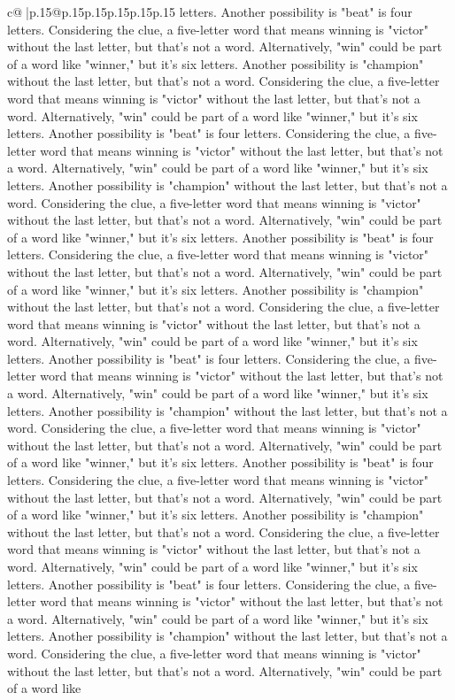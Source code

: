 \documentclass{article}
\begin{document}
{\begin{supertabular}{c@{$\;$}|p{.15\linewidth}@{}p{.15\linewidth}p{.15\linewidth}p{.15\linewidth}p{.15\linewidth}p{.15\linewidth}}
{{{letters. Another possibility is "beat" is four letters. Considering the clue, a five{-}letter word that means winning is "victor" without the last letter, but that's not a word. Alternatively, "win" could be part of a word like "winner," but it's six letters. Another possibility is "champion" without the last letter, but that's not a word. Considering the clue, a five{-}letter word that means winning is "victor" without the last letter, but that's not a word. Alternatively, "win" could be part of a word like "winner," but it's six letters. Another possibility is "beat" is four letters. Considering the clue, a five{-}letter word that means winning is "victor" without the last letter, but that's not a word. Alternatively, "win" could be part of a word like "winner," but it's six letters. Another possibility is "champion" without the last letter, but that's not a word. Considering the clue, a five{-}letter word that means winning is "victor" without the last letter, but that's not a word. Alternatively, "win" could be part of a word like "winner," but it's six letters. Another possibility is "beat" is four letters. Considering the clue, a five{-}letter word that means winning is "victor" without the last letter, but that's not a word. Alternatively, "win" could be part of a word like "winner," but it's six letters. Another possibility is "champion" without the last letter, but that's not a word. Considering the clue, a five{-}letter word that means winning is "victor" without the last letter, but that's not a word. Alternatively, "win" could be part of a word like "winner," but it's six letters. Another possibility is "beat" is four letters. Considering the clue, a five{-}letter word that means winning is "victor" without the last letter, but that's not a word. Alternatively, "win" could be part of a word like "winner," but it's six letters. Another possibility is "champion" without the last letter, but that's not a word. Considering the clue, a five{-}letter word that means winning is "victor" without the last letter, but that's not a word. Alternatively, "win" could be part of a word like "winner," but it's six letters. Another possibility is "beat" is four letters. Considering the clue, a five{-}letter word that means winning is "victor" without the last letter, but that's not a word. Alternatively, "win" could be part of a word like "winner," but it's six letters. Another possibility is "champion" without the last letter, but that's not a word. Considering the clue, a five{-}letter word that means winning is "victor" without the last letter, but that's not a word. Alternatively, "win" could be part of a word like "winner," but it's six letters. Another possibility is "beat" is four letters. Considering the clue, a five{-}letter word that means winning is "victor" without the last letter, but that's not a word. Alternatively, "win" could be part of a word like "winner," but it's six letters. Another possibility is "champion" without the last letter, but that's not a word. Considering the clue, a five{-}letter word that means winning is "victor" without the last letter, but that's not a word. Alternatively, "win" could be part of a word like }}}
\end{supertabular}}
\end{document}
